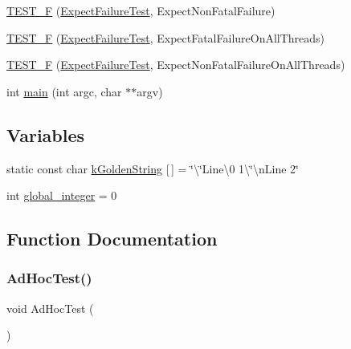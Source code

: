 \begin{DoxyCompactItemize}
\item 
\mbox{\hyperlink{googletest-output-test___8cc_abec150ac715359c89fde1102cfc300d2}{T\+E\+S\+T\+\_\+F}} (\mbox{\hyperlink{classExpectFailureTest}{Expect\+Failure\+Test}}, Expect\+Non\+Fatal\+Failure)
\item 
\mbox{\hyperlink{googletest-output-test___8cc_a1f29562e9248524dda90aa6d641d77ea}{T\+E\+S\+T\+\_\+F}} (\mbox{\hyperlink{classExpectFailureTest}{Expect\+Failure\+Test}}, Expect\+Fatal\+Failure\+On\+All\+Threads)
\item 
\mbox{\hyperlink{googletest-output-test___8cc_a7714d1899711a604704737897595e7c3}{T\+E\+S\+T\+\_\+F}} (\mbox{\hyperlink{classExpectFailureTest}{Expect\+Failure\+Test}}, Expect\+Non\+Fatal\+Failure\+On\+All\+Threads)
\item 
int \mbox{\hyperlink{googletest-output-test___8cc_a3c04138a5bfe5d72780bb7e82a18e627}{main}} (int argc, char $\ast$$\ast$argv)
\end{DoxyCompactItemize}
\subsection*{Variables}
\begin{DoxyCompactItemize}
\item 
static const char \mbox{\hyperlink{googletest-output-test___8cc_a6db44d0c97a2b93be43ba6c8104b7511}{k\+Golden\+String}} \mbox{[}$\,$\mbox{]} = \char`\"{}\textbackslash{}\char`\"{}Line\textbackslash{}0 1\textbackslash{}\char`\"{}\textbackslash{}n\+Line 2\char`\"{}
\item 
int \mbox{\hyperlink{googletest-output-test___8cc_a81be7f35ea2573ecc7ca08b26b56bccf}{global\+\_\+integer}} = 0
\end{DoxyCompactItemize}


\subsection{Function Documentation}
\mbox{\label{googletest-output-test___8cc_a36cd4d21174efaa3066237d716028d49}} 
\subsubsection{\texorpdfstring{AdHocTest()}{AdHocTest()}}
{\footnotesize\ttfamily void Ad\+Hoc\+Test (\begin{DoxyParamCaption}{ }\end{DoxyParamCaption})}


